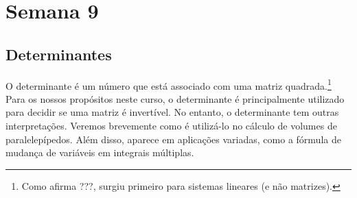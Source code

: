 

\providecommand{\dir}{..}


%

\chapter{Semana 9}

\section{Determinantes}

O determinante é um número que está associado com uma matriz quadrada.\footnote{Como afirma ???, surgiu primeiro para sistemas lineares (e não matrizes).} Para os nossos propósitos neste curso, o determinante é principalmente utilizado para decidir se uma matriz é invertível. No entanto, o determinante tem outras interpretações. Veremos brevemente como é utilizá-lo no cálculo de volumes de paralelepípedos. Além disso, aparece em aplicações variadas, como a fórmula de mudança de variáveis em integrais múltiplas.

